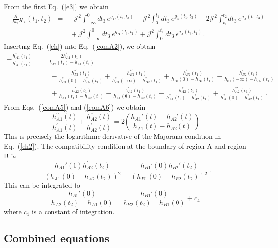 \documentclass[prx,aps,onecolumn,amsfonts,showpacs,superscriptaddress,preprint,eqsecnum]
{revtex4-1}
\newcommand{\beq}{\begin{equation}}
\newcommand{\eeq}{\end{equation}}
\def\bea{\begin{eqnarray}}
\def\eea{\end{eqnarray}}
\newcommand{\nn}{\nonumber \\}
\begin{document}
From the first Eq.~(\ref{e3}) we obtain
\bea
-\frac{\partial}{\partial t_1} g_A (t_1,t_2) &=&   -\mathcal{J}^2 \int_{-\infty}^{0} dt_3 \,   e^{g_D (t_1, t_3)} 
 -\mathcal{J}^2 \int_{0}^{t_1} dt_3 \,   e^{g_{\widetilde{A}} (t_1, t_3)} 
  - 2\mathcal{J}^2 \int_{t_1}^{t_2} dt_3 \,   e^{g_A (t_1, t_3)} \nn
  &~&~  +\mathcal{J}^2 \int_{-\infty}^{0} dt_3 \,   e^{g_B (t_3, t_1)} 
   + \mathcal{J}^2 \int_{0}^{t_1} dt_3 \,   e^{g_A (t_3, t_1)} \,.\label{eomA2}
\eea
Inserting Eq.~(\ref{eh}) into Eq.~(\ref{eomA2}), we obtain
\bea
-\frac{h_{A1}^{\prime\prime} (t_1)}{h_{A1}^{\prime} (t_1)} &=& 
 \frac{2 h_{A1}^{\prime} (t_1)}{h_{A2} (t_1) - h_{A1} (t_1)} \label{eomA6} \\
&~&~
 - \frac{h_{B2}^{\ast\prime} (t_1)}{h_{B1}^{\ast} (0) - h_{B2}^{\ast} (t_1)}
+ \frac{h_{B2}^{\ast\prime} (t_1)}{h_{B1}^{\ast} (-\infty) - h_{B2}^{\ast} (t_1)}
+ \frac{h_{B2}^{\prime} (t_1)}{h_{B1} (0) - h_{B2} (t_1)} -  \frac{h_{B2}^{\prime} (t_1)}{h_{B1} (-\infty) - h_{B2} (t_1)} \nn
&~&~
+ \frac{h_{A2}^{\prime} (t_1)}{h_{A1} (t_1) - h_{A2} (t_1)} - \frac{h_{A2}^{\prime} (t_1)}{h_{A1} (0) - h_{A2} (t_1)}
- \frac{h_{A2}^{\ast\prime} (t_1)}{h_{A1}^{\ast} (t_1) - h_{A2}^\ast (t_1)} + \frac{h_{A2}^{\ast\prime} (t_1)}{h_{A1}^\ast (0) - h_{A2}^\ast (t_1)} \,.
\nonumber
\eea
From Eqs.~(\ref{eomA5}) and (\ref{eomA6}) we obtain
\beq
\frac{h_{A1}^{\prime\prime} (t)}{h_{A1}^{\prime} (t)} + \frac{h_{A2}^{\prime\prime} (t)}{h_{A2}^{\prime} (t)} = 
2 \left(\frac{h_{A1}'(t)- h_{A2}' (t) }{h_{A1} (t)  - h_{A2} (t)} \right)\,.
\eeq
This is precisely the logarithmic derivative of the Majorana condition in Eq.~(\ref{eh2}).
The compatibility condition at the boundary of region A and region B is
\beq
\frac{h_{A1}' (0) h_{A2}^{\prime} (t_2)}{(h_{A1} (0) - h_{A2} (t_2))^2} = \frac{h_{B1}' (0) h_{B2}' (t_2)}{(h_{B1} (0) - h_{B2} (t_2))^2} \,. \label{sA1}
\eeq
This can be integrated to 
\beq
\frac{h_{A1}' (0)}{h_{A2} (t_2) - h_{A1} (0)} = \frac{h_{B1}' (0)}{h_{B2} (t_2)-h_{B1} (0) } + c_4\,, \label{sA2}
\eeq
where $c_4$ is a constant of integration.

\subsection{Combined equations}
\end{document}
